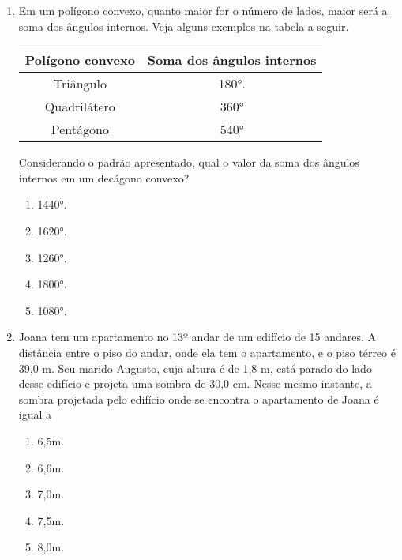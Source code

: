 \documentclass[a4paper,14pt]{article}
\begin{document}
\begin{enumerate}
	    \item Em um polígono convexo, quanto maior for o número de lados, maior será a soma dos ângulos internos.
	    \newline Veja alguns exemplos na tabela a seguir.
	    \newline
	    \newline
	    \begin{tabular}{|c|c|} %
	    	\hline %
	    	Polígono convexo & Soma dos ângulos internos \\ %
	    	\hline %
	    	Triângulo & 180°. \\ %
	    	\hline %
	    	Quadrilátero & 360° \\ %
	    	\hline %
	    	Pentágono & 540° \\ %
	    	\hline %
	    \end{tabular}
        \newline
        \newline
        Considerando o padrão apresentado, qual o valor da soma dos ângulos internos em um decágono
        convexo?
        \begin{enumerate}
        	\item 1440°.
        	\item 1620°.
        	\item 1260°.
        	\item 1800°.
        	\item 1080°.
        \end{enumerate}
        \vspace{1cm}
        
        \item Joana tem um apartamento no 13º andar de um edifício de 15 andares. A distância entre o piso do andar,
        onde ela tem o apartamento, e o piso térreo é 39,0 m. Seu marido Augusto, cuja altura é de 1,8 m, está
        parado do lado desse edifício e projeta uma sombra de 30,0 cm.
        Nesse mesmo instante, a sombra projetada pelo edifício onde se encontra o apartamento de Joana é igual a 
        \begin{enumerate}
        	\item 6,5m.
        	\item 6,6m.
        	\item 7,0m.
        	\item 7,5m.
        	\item 8,0m.
        \end{enumerate}
        \vspace{4cm}
        

\end{enumerate}
\end{document}
